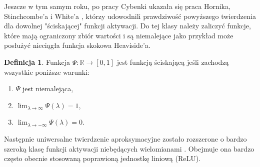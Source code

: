 \documentclass[11pt]{book}
\theoremstyle{definition}
\newtheorem{definition}{Definicja}[section]
\begin{document}
Jeszcze w tym samym roku, po pracy Cybenki ukazała się praca Hornika, Stinchcombe'a i White'a \cite{Hornik1989}, którzy udowodnili prawdziwość powyższego twierdzenia dla dowolnej "ściskającej" funkcji aktywacji. Do tej klasy należy zaliczyć funkcje, które mają ograniczony zbiór wartości i są niemalejące jako przykład może posłużyć nieciągła funkcja skokowa Heaviside'a. 
%
\begin{definition}
	Funkcja $\Psi : \mathbb{R}\rightarrow [0,1]$ jest funkcją ściskającą jeśli zachodzą wszystkie poniższe warunki:
	\begin{enumerate}
		\setlength\itemsep{0.em}
		\item $\Psi$ jest niemalejąca,
		\item $\lim_{\lambda \rightarrow \infty} \Psi(\lambda) = 1$,
		\item $\lim_{\lambda \rightarrow -\infty} \Psi(\lambda) = 0$.
	\end{enumerate}

\end{definition}
%
Następnie uniwersalne twierdzenie aproksymacyjne zostało rozszerone o bardzo szeroką klasę funkcji aktywacji niebędących wielomianami \cite{Leshno1993MultilayerFN}. Obejmuje ona bardzo często obecnie stosowaną poprawioną jednostkę liniową (ReLU). 
\end{document}
